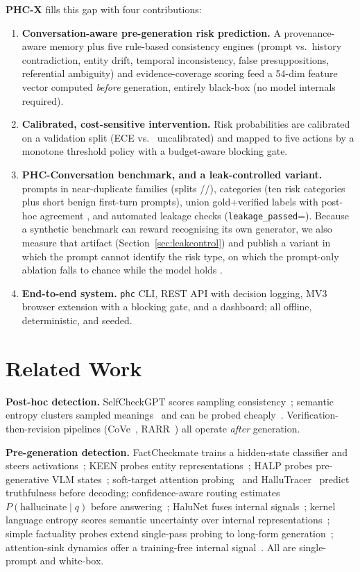 \documentclass[conference,a4paper]{IEEEtran}
\begin{document}
\textbf{PHC-X} fills this gap with four contributions:
\begin{enumerate}
\item \textbf{Conversation-aware pre-generation risk prediction.} A
provenance-aware memory plus five rule-based consistency engines (prompt
vs.\ history contradiction, entity drift, temporal inconsistency, false
presuppositions, referential ambiguity) and evidence-coverage scoring feed a
54-dim feature vector computed \emph{before} generation, entirely
black-box (no model internals required).
\item \textbf{Calibrated, cost-sensitive intervention.} Risk probabilities
are calibrated on a validation split (ECE \ece{} vs.\ \uece{} uncalibrated)
and mapped to five actions by a monotone threshold policy with a
budget-aware blocking gate.
\item \textbf{PHC-Conversation benchmark, and a leak-controlled variant.}
\nrows{} prompts in \nfamilies{} near-duplicate families (splits
\ntrain/\nval/\ntest), \ncategories{} categories (ten risk categories plus
short benign first-turn prompts), union gold+verified labels with post-hoc
agreement \agreement{}, and automated leakage checks
(\texttt{leakage\_passed}=\leakage). Because a synthetic benchmark can
reward recognising its own generator, we also measure that artifact
(Section~\ref{sec:leakcontrol}) and publish a variant in which the prompt
cannot identify the risk type, on which the prompt-only ablation falls to
chance while the model holds \lcauc{}.
\item \textbf{End-to-end system.} \texttt{phc} CLI, REST API with decision
logging, MV3 browser extension with a blocking gate, and a dashboard; all
offline, deterministic, and seeded.
\end{enumerate}

\section{Related Work}
\textbf{Post-hoc detection.} SelfCheckGPT scores sampling
consistency~\cite{selfcheckgpt}; semantic entropy clusters sampled
meanings~\cite{kuhn2023} and can be probed cheaply~\cite{semanticentropyp}.
Verification-then-revision pipelines (CoVe~\cite{cove},
RARR~\cite{rarr}) all operate \emph{after} generation.

\textbf{Pre-generation detection.} FactCheckmate trains a hidden-state
classifier and steers activations~\cite{factcheckmate}; KEEN probes entity
representations~\cite{keen}; HALP probes pre-generative VLM
states~\cite{halp}; soft-target attention probing~\cite{miftakhova2026}
and HalluTracer~\cite{hallutracer} predict truthfulness before decoding;
confidence-aware routing estimates $P(\text{hallucinate}\mid q)$ before
answering~\cite{nandakishor2025}; HaluNet fuses internal
signals~\cite{halunet}; kernel language entropy scores semantic
uncertainty over internal representations~\cite{kernelformula}; simple
factuality probes extend single-pass probing to long-form
generation~\cite{han2025}; attention-sink dynamics offer a training-free
internal signal~\cite{binkowski2026}. All are single-prompt and
white-box.
\end{document}
